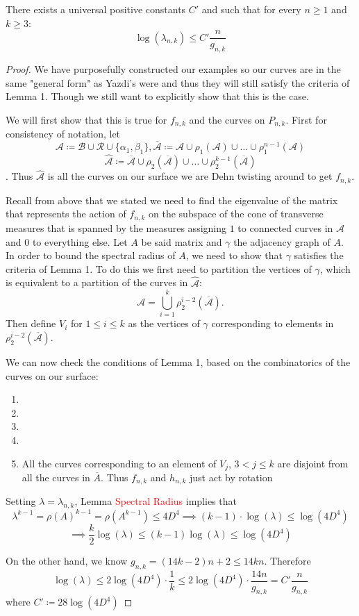 \begin{lem}
There exists a universal positive constants $C'$ and such that for every $n \geq 1$ and $k \geq 3$:
$$\log(\lambda_{n,k}) \leq C'\frac{n}{g_{n,k}}$$
\end{lem}

\begin{proof}
We have purposefully constructed our examples so our curves are in the same "general form" as Yazdi's were and thus they will still satisfy the criteria of Lemma 1. Though we still want to explicitly show that this is the case.

We will first show that this is true for $f_{n,k}$ and the curves on $P_{n,k}$. First for consistency of notation, let
$$\mathcal{A} \coloneqq \mathcal{B} \cup \mathcal{R} \cup \{\alpha_1,\beta_1\}, \overline{\mathcal{A}} \coloneqq \mathcal{A} \cup \rho_1(\mathcal{A}) \cup \dots \cup \rho_1^{n-1}(\mathcal{A})$$
$$\hat{\mathcal{A}} \coloneqq \overline{\mathcal{A}} \cup \rho_2(\overline{\mathcal{A}}) \cup \dots \cup \rho_2^{k-1}(\overline{\mathcal{A}})$$. Thus $\hat{\mathcal{A}}$ is all the curves on our surface we are Dehn twisting around to get $f_{n,k}$. 

Recall from above that we stated we need to find the eigenvalue of the matrix that represents the action of $f_{n,k}$ on the subspace of the cone of transverse measures that is spanned by the measures assigning $1$ to connected curves in $\hat{\mathcal{A}}$ and 0 to everything else. Let $A$ be said matrix and $\gamma$ the adjacency graph of $A$. In order to bound the spectral radius of $A$, we need to show that $\gamma$ satisfies the criteria of Lemma 1. To do this we first need to partition the vertices of $\gamma$, which is equivalent to a partition of the curves in $\hat{\mathcal{A}}$: $$\mathcal{A} = \bigcup_{i=1}^k \rho_2^{i-2}(\overline{\mathcal{A}}).$$ Then define $V_i$ for $1 \leq i \leq k$ as the vertices of $\gamma$ corresponding to elements in $\rho_2^{i-2}(\overline{\mathcal{A}})$.

We can now check the conditions of Lemma 1, based on the combinatorics of the curves on our surface:
\begin{enumerate}
    \item 
    \item 
    \item 
    \item 
    \item All the curves corresponding to an element of $V_j$, $3 < j \leq k$ are disjoint from all the curves in $\overline{A}$. Thus $f_{n,k}$ and $h_{n,k}$ just act by rotation
\end{enumerate}

Setting $\lambda = \lambda_{n,k}$, Lemma \textcolor{red}{Spectral Radius} implies that 
$$\lambda^{k-1} = \rho(A)^{k-1} = \rho(A^{k-1}) \leq 4D^4 \implies (k-1)\cdot \log(\lambda) \leq \log(4D^4)$$ $$\implies \frac{k}{2}\log(\lambda) \leq (k-1)\log(\lambda) \leq \log(4D^4)$$

On the other hand, we know $g_{n,k} = (14k - 2)n + 2 \leq 14kn$. Therefore
$$\log(\lambda) \leq 2\log(4D^4)\cdot\frac{1}{k} \leq 2\log(4D^4)\cdot \frac{14n}{g_{n,k}} = C'\frac{n}{g_{n,k}}$$ where $C' \coloneqq 28\log(4D^4)$
\end{proof}

